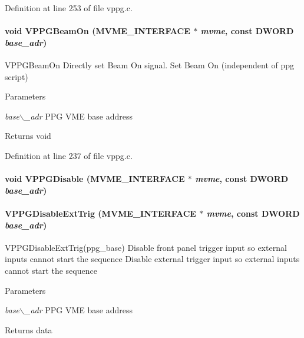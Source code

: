 Definition at line 253 of file vppg.c.
\paragraph[{VPPGBeamOn}]{\setlength{\rightskip}{0pt plus 5cm}void VPPGBeamOn ({\bf MVME\_\-INTERFACE} $\ast$ {\em mvme}, \/  const {\bf DWORD} {\em base\_\-adr})}\hfill\label{vppg_8h_acbbb2e3ab52f1662cfd8fba628ebf1ca}
VPPGBeamOn Directly set Beam On signal.  Set Beam On (independent of ppg script) 
\begin{DoxyParams}{Parameters}
\item[{\em base$\backslash$\_\-adr}]PPG VME base address \end{DoxyParams}
\begin{DoxyReturn}{Returns}
void 
\end{DoxyReturn}


Definition at line 237 of file vppg.c.
\paragraph[{VPPGDisable}]{\setlength{\rightskip}{0pt plus 5cm}void VPPGDisable ({\bf MVME\_\-INTERFACE} $\ast$ {\em mvme}, \/  const {\bf DWORD} {\em base\_\-adr})}\hfill\label{vppg_8h_a2c5f80c00f294e2a416891ea22e77824}
\paragraph[{VPPGDisableExtTrig}]{ VPPGDisableExtTrig ({\bf MVME\_\-INTERFACE} $\ast$ {\em mvme}, \/  const {\bf DWORD} {\em base\_\-adr})}\hfill\label{vppg_8h_a137e2408b777c360d4adc12f37ed90e6}
VPPGDisableExtTrig(ppg\_\-base) Disable front panel trigger input so external inputs cannot start the sequence  Disable external trigger input so external inputs cannot start the sequence 
\begin{DoxyParams}{Parameters}
\item[{\em base$\backslash$\_\-adr}]PPG VME base address \end{DoxyParams}
\begin{DoxyReturn}{Returns}
data 
\end{DoxyReturn}


